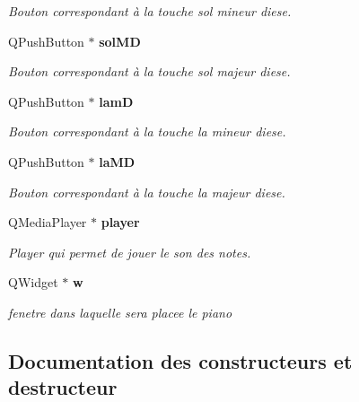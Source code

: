 \begin{DoxyCompactItemize}
\begin{DoxyCompactList}\small\item\em Bouton correspondant à la touche sol mineur diese. \end{DoxyCompactList}\item 
Q\-Push\-Button $\ast$ {\bf sol\-M\-D}\label{class_clavier_piano_a261ac980129f3cfeeab43952fe76ea08}

\begin{DoxyCompactList}\small\item\em Bouton correspondant à la touche sol majeur diese. \end{DoxyCompactList}\item 
Q\-Push\-Button $\ast$ {\bf lam\-D}\label{class_clavier_piano_a22cb769fba737e2c86d73205635b2a7f}

\begin{DoxyCompactList}\small\item\em Bouton correspondant à la touche la mineur diese. \end{DoxyCompactList}\item 
Q\-Push\-Button $\ast$ {\bf la\-M\-D}\label{class_clavier_piano_a747ab99bc7db016f676adf49ae0f7a32}

\begin{DoxyCompactList}\small\item\em Bouton correspondant à la touche la majeur diese. \end{DoxyCompactList}\item 
Q\-Media\-Player $\ast$ {\bf player}\label{class_clavier_piano_ac9b473b766ffe07422aa68cc7d295de3}

\begin{DoxyCompactList}\small\item\em Player qui permet de jouer le son des notes. \end{DoxyCompactList}\item 
Q\-Widget $\ast$ {\bf w}\label{class_clavier_piano_aaea71e40c5e2edffb0c80a3c571953a0}

\begin{DoxyCompactList}\small\item\em fenetre dans laquelle sera placee le piano \end{DoxyCompactList}\end{DoxyCompactItemize}


\subsection{Documentation des constructeurs et destructeur}
